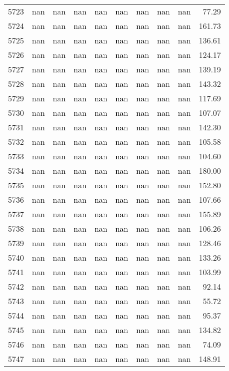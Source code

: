 \begin{tabular}{lrrrrrrrrr}
5723 & nan & nan & nan & nan & nan & nan & nan & nan & 77.29 \\
5724 & nan & nan & nan & nan & nan & nan & nan & nan & 161.73 \\
5725 & nan & nan & nan & nan & nan & nan & nan & nan & 136.61 \\
5726 & nan & nan & nan & nan & nan & nan & nan & nan & 124.17 \\
5727 & nan & nan & nan & nan & nan & nan & nan & nan & 139.19 \\
5728 & nan & nan & nan & nan & nan & nan & nan & nan & 143.32 \\
5729 & nan & nan & nan & nan & nan & nan & nan & nan & 117.69 \\
5730 & nan & nan & nan & nan & nan & nan & nan & nan & 107.07 \\
5731 & nan & nan & nan & nan & nan & nan & nan & nan & 142.30 \\
5732 & nan & nan & nan & nan & nan & nan & nan & nan & 105.58 \\
5733 & nan & nan & nan & nan & nan & nan & nan & nan & 104.60 \\
5734 & nan & nan & nan & nan & nan & nan & nan & nan & 180.00 \\
5735 & nan & nan & nan & nan & nan & nan & nan & nan & 152.80 \\
5736 & nan & nan & nan & nan & nan & nan & nan & nan & 107.66 \\
5737 & nan & nan & nan & nan & nan & nan & nan & nan & 155.89 \\
5738 & nan & nan & nan & nan & nan & nan & nan & nan & 106.26 \\
5739 & nan & nan & nan & nan & nan & nan & nan & nan & 128.46 \\
5740 & nan & nan & nan & nan & nan & nan & nan & nan & 133.26 \\
5741 & nan & nan & nan & nan & nan & nan & nan & nan & 103.99 \\
5742 & nan & nan & nan & nan & nan & nan & nan & nan & 92.14 \\
5743 & nan & nan & nan & nan & nan & nan & nan & nan & 55.72 \\
5744 & nan & nan & nan & nan & nan & nan & nan & nan & 95.37 \\
5745 & nan & nan & nan & nan & nan & nan & nan & nan & 134.82 \\
5746 & nan & nan & nan & nan & nan & nan & nan & nan & 74.09 \\
5747 & nan & nan & nan & nan & nan & nan & nan & nan & 148.91 \\

\end{tabular}
